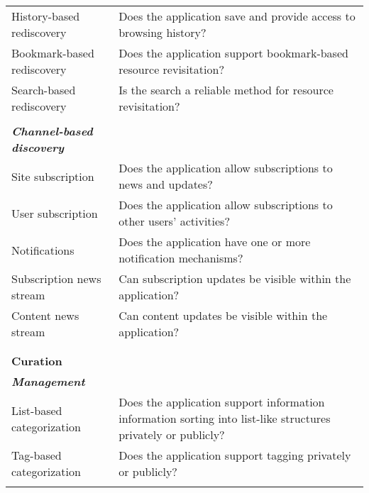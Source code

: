 \documentclass{casconpaper}
\begin{document}
{\begin{table*}[htbp]
\begin{tabular}{|p{0.30\linewidth}|p{0.70\linewidth}|}
History-based rediscovery    & Does the application save and provide access to browsing history?                                        \\
Bookmark-based rediscovery   & Does the application support bookmark-based resource revisitation?                                        \\
Search-based rediscovery     & Is the search a reliable method for resource revisitation?                             \\
&\\
\emph{\textbf{Channel-based discovery}}          &                                                                                                           \\
Site subscription            & Does the application allow subscriptions to news and updates?                                             \\
User subscription             & Does the application allow subscriptions to other users' activities?                                      \\
Notifications                & Does the application have one or more notification mechanisms?                                                      \\
Subscription news stream                  & Can subscription updates be visible within the application?  \\
Content news stream                  & Can content updates be visible within the application? \\
&\\
\hline     
&\\                                        
\textbf{\large{Curation}}                     &                                                                                                        \\       
\emph{\textbf{Management}}                    &                                                                                                           \\
List-based categorization               & Does the application support information information sorting into list-like structures privately or publicly?                                                  \\
Tag-based categorization               & Does the application support tagging privately or publicly?                                                  \\
&\\

\end{tabular}
\end{table*}}
\end{document}
